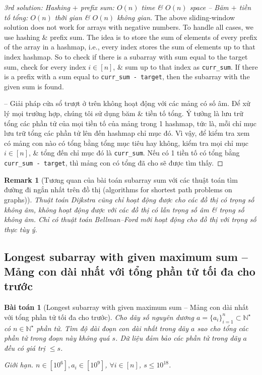 \documentclass{article}
\newtheorem{baitoan}{Bài toán}
\newtheorem{remark}{Remark}
\begin{document}
\begin{proof}[3rd solution: Hashing $+$ prefix sum: $O(n)$ time \& $O(n)$ space -- Băm $+$ tiền tố tổng: $O(n)$ thời gian \& $O(n)$ không gian]
    The above sliding-window solution does not work for arrays with negative numbers. To handle all cases, we use hashing \& prefix sum. The idea is to store the sum of elements of every prefix of the array in a hashmap, i.e., every index stores the sum of elements up to that index hashmap. So to check if there is a subarray with sum equal to the target sum, check for every index $i\in[n]$, \& sum up to that index as \verb|curr_sum|. If there is a prefix with a sum equal to \verb|curr_sum - target|, then the subarray with the given sum is found.

    -- Giải pháp cửa sổ trượt ở trên không hoạt động với các mảng có số âm. Để xử lý mọi trường hợp, chúng tôi sử dụng băm \& tiền tố tổng. Ý tưởng là lưu trữ tổng các phần tử của mọi tiền tố của mảng trong 1 hashmap, tức là, mỗi chỉ mục lưu trữ tổng các phần tử lên đến hashmap chỉ mục đó. Vì vậy, để kiểm tra xem có mảng con nào có tổng bằng tổng mục tiêu hay không, kiểm tra mọi chỉ mục $i\in[n]$, \& tổng đến chỉ mục đó là \verb|curr_sum|. Nếu có 1 tiền tố có tổng bằng \verb|curr_sum - target|, thì mảng con có tổng đã cho sẽ được tìm thấy.
\end{proof}

\begin{remark}[Tương quan của bài toán subarray sum với các thuật toán tìm đường đi ngắn nhất trên đồ thị (algorithms for shortest path problems on graphs)]
    Thuật toán Dijkstra cũng chỉ hoạt động được cho các đồ thị có trọng số không âm, không hoạt động được với các đồ thị có lẫn trọng số âm \& trọng số không âm. Chỉ có thuật toán Bellman--Ford mới hoạt động cho đồ thị với trọng số thực tùy ý.
\end{remark}


\subsection{Longest subarray with given maximum sum -- Mảng con dài nhất với tổng phần tử tối đa cho trước}

\begin{baitoan}[Longest subarray with given maximum sum -- Mảng con dài nhất với tổng phần tử tối đa cho trước]
    Cho dãy số nguyên dương $a = \{a_i\}_{i=1}^n\subset\mathbb{N}^\star$ có $n\in\mathbb{N}^\star$ phần tử. Tìm độ dài đoạn con dài nhất trong dãy $a$ sao cho tổng các phần tử trong đoạn này không quá $s$. Dữ liệu đảm bảo các phần tử trong dãy $a$ đều có giá trị $\le s$.
    \item {\sf Giới hạn.} $n\in[10^6],a_i\in[10^9]$, $\forall i\in[n]$, $s\le10^{18}$.
\end{baitoan}
\end{document}
